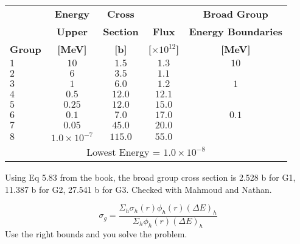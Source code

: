 \documentclass[11pt,answers,addpoints]{exam}
\begin{document}
\begin{questions}
        \begin{center}
                        \begin{tabular}{lcccc}
                                               & \textbf{Energy}  & \textbf{Cross} & & \textbf{Broad Group}\\
                                               & \textbf{Upper} & \textbf{Section}  & \textbf{Flux} & \textbf{Energy Boundaries}\\
                                 \textbf{Group}  & \textbf{[MeV]} & \textbf{[b]}  &        \textbf{[$\times10^{12}$]}       & \textbf{[MeV]}\\ 
                                \hline
                                               $1$      &    $10$      &    $1.5$      &    $1.3$      &    $10$      \\ 
                                               $2$      &    $6$      &    $3.5$      &    $1.1$      &    \\ 
                                               $3$      &    $1$      &    $6.0$      &    $1.2$      &    $1$      \\ 
                                               $4$      &    $0.5$      &    $12.0$      &    $12.1$      &    \\ 
                                               $5$      &    $0.25$      &    $12.0$      &    $15.0$      &    \\ 
                                               $6$      &    $0.1$      &    $7.0$      &    $17.0$      &    $0.1$      \\ 
                                               $7$      &    $0.05$      &    $45.0$      &    $20.0$      &    \\ 
                                               $8$      &    $1.0\times10^{-7}$      &    $115.0$      &    $55.0$      &         \\ 
                                               \multicolumn{5}{c}{Lowest Energy = $1.0\times10^{-8}$}\\
                                \hline
                        \end{tabular}
        \end{center}
\begin{solution}
Using Eq 5.83 from the book, the broad group cross section is 2.528 b for G1, 11.387 b for G2, 27.541 b for G3. Checked with Mahmoud and Nathan.

\begin{equation}
    \sigma_g = \frac{\Sigma_h \sigma_h(r) \phi_h(r) (\Delta E)_h}{\Sigma_h \phi_h(r) (\Delta E)_h}
\end{equation}
Use the right bounds and you solve the problem.

\end{solution}

\end{questions}
\end{document}
